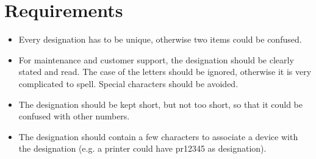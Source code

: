 %
%
%
%
%
%
%

\section{Requirements}

\begin{itemize}
	\item Every designation has to be unique, otherwise two items could be
		confused.

	\item For maintenance and customer support, the designation should be
		clearly stated and read. The case of the letters should be ignored,
		otherwise it is very complicated to spell. Special characters should be
		avoided.

	\item The designation should be kept short, but not too short, so that it
		could be confused with other numbers.

	\item The designation should contain a few characters to associate a device
		with the designation (e.g. a printer could have pr12345 as designation).
\end{itemize}
